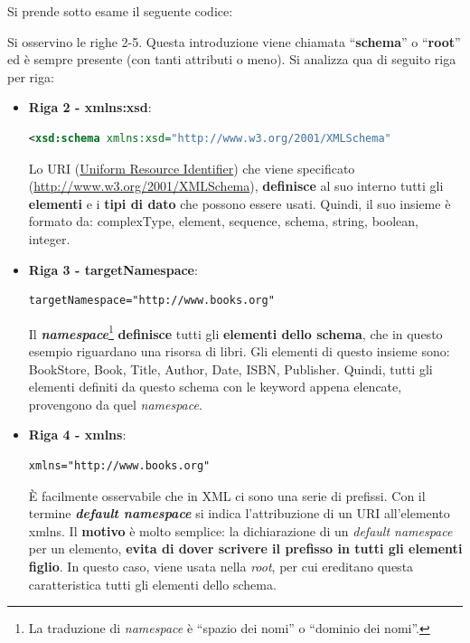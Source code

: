 \documentclass[a4paper]{article}
\newcommand{\dquotes}[1]{``#1''}
\begin{document}
	Si prende sotto esame il seguente codice:
	
	Si osservino le righe 2-5. Questa introduzione viene chiamata \dquotes{\textbf{schema}} o \dquotes{\textbf{root}} ed è sempre presente (con tanti attributi o meno). Si analizza qua di seguito riga per riga:
	\begin{itemize}
		\item \textcolor{Red3}{\textbf{Riga 2 - \textsf{xmlns:xsd}}}:
		\begin{lstlisting}[language=XML]
<xsd:schema xmlns:xsd="http://www.w3.org/2001/XMLSchema"\end{lstlisting}
		Lo URI (\href{https://en.wikipedia.org/wiki/Uniform_Resource_Identifier}{Uniform Resource Identifier}) che viene specificato (\url{http://www.w3.org/2001/XMLSchema}), \textbf{definisce} al suo interno tutti gli \textbf{elementi} e i \textbf{tipi di dato} che possono essere usati. Quindi, il suo insieme è formato da: \textsf{complexType, element, sequence, schema, string, boolean, integer}.\newpage
		
		\item \textcolor{Red3}{\textbf{Riga 3 - \textsf{targetNamespace}}}:
		\begin{lstlisting}[language=XML]
targetNamespace="http://www.books.org"\end{lstlisting}
		Il \textbf{\emph{namespace}}\footnote{La traduzione di \emph{namespace} è \dquotes{spazio dei nomi} o \dquotes{dominio dei nomi}.} \textbf{definisce} tutti gli \textbf{elementi dello schema}, che in questo esempio riguardano una risorsa di libri. Gli elementi di questo insieme sono: \textsf{BookStore, Book, Title, Author, Date, ISBN, Publisher}. Quindi, tutti gli elementi definiti da questo schema con le keyword appena elencate, provengono da quel \emph{namespace}.
		
		\item \textcolor{Red3}{\textbf{Riga 4 - \textsf{xmlns}}}:
		\begin{lstlisting}[language=XML]
xmlns="http://www.books.org"\end{lstlisting}
		È facilmente osservabile che in XML ci sono una serie di prefissi. Con il termine \textbf{\emph{default namespace}} si indica l'attribuzione di un URI all'elemento \textsf{xmlns}. Il \textbf{motivo} è molto semplice: la dichiarazione di un \emph{default namespace} per un elemento, \textbf{evita di dover scrivere il prefisso in tutti gli elementi figlio}. In questo caso, viene usata nella \emph{root}, per cui ereditano questa caratteristica tutti gli elementi dello schema.
		

\end{itemize}
\end{document}

